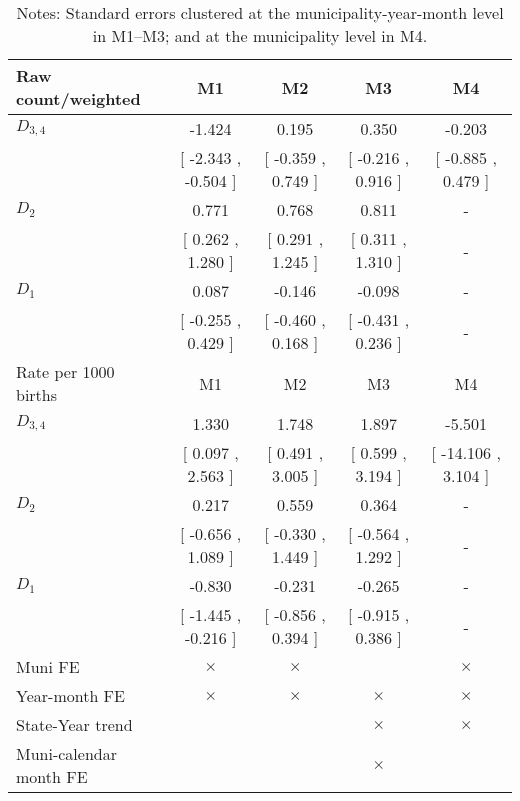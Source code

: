 \begin{table}[!ht]
\centering
\caption{Effects of Drought on apgar_l7}\label{tab:twfe_apgar_l7}
\fontsize{10pt}{12pt}\selectfont
\begin{tabular}{lcccc}
\toprule
  Raw count/weighted &\multicolumn{1}{c}{M1}&\multicolumn{1}{c}{M2}&\multicolumn{1}{c}{M3}&\multicolumn{1}{c}{M4} \\
\midrule
 $ D_{3,4} $ &    -1.424 &     0.195 &     0.350 &    -0.203 \\ 
 & [    -2.343 ,    -0.504 ] & [    -0.359 ,     0.749 ] & [    -0.216 ,     0.916 ] & [    -0.885 ,     0.479 ] \\ 
\addlinespace
 $ D_2 $ &     0.771 &     0.768 &     0.811 & - \\ 
 & [     0.262 ,     1.280 ] & [     0.291 ,     1.245 ] & [     0.311 ,     1.310 ] & - \\ 
\addlinespace
 $ D_1 $ &     0.087 &    -0.146 &    -0.098 & - \\ 
 & [    -0.255 ,     0.429 ] & [    -0.460 ,     0.168 ] & [    -0.431 ,     0.236 ] & - \\ 
\addlinespace
\midrule
  Rate per 1000 births &\multicolumn{1}{c}{M1}&\multicolumn{1}{c}{M2}&\multicolumn{1}{c}{M3}&\multicolumn{1}{c}{M4} \\
\midrule
 $ D_{3,4} $ &     1.330 &     1.748 &     1.897 &    -5.501 \\ 
 & [     0.097 ,     2.563 ] & [     0.491 ,     3.005 ] & [     0.599 ,     3.194 ] & [   -14.106 ,     3.104 ] \\ 
\addlinespace
 $ D_2 $ &     0.217 &     0.559 &     0.364 & - \\ 
 & [    -0.656 ,     1.089 ] & [    -0.330 ,     1.449 ] & [    -0.564 ,     1.292 ] & - \\ 
\addlinespace
 $ D_1 $ &    -0.830 &    -0.231 &    -0.265 & - \\ 
 & [    -1.445 ,    -0.216 ] & [    -0.856 ,     0.394 ] & [    -0.915 ,     0.386 ] & - \\ 
\midrule
  Muni FE & $ \times $ & $ \times $ &  & $ \times $  \\
  Year-month FE & $ \times $ & $ \times $ & $ \times $ & $ \times $ \\
  State-Year trend &  &  & $ \times $ & $ \times $ \\
  Muni-calendar month FE &  &  & $ \times $ & \\
\bottomrule
\end{tabular}
\caption*{\footnotesize{Notes: Standard errors clustered at the municipality-year-month level in M1--M3; and at the municipality level in M4.}}
\end{table}
